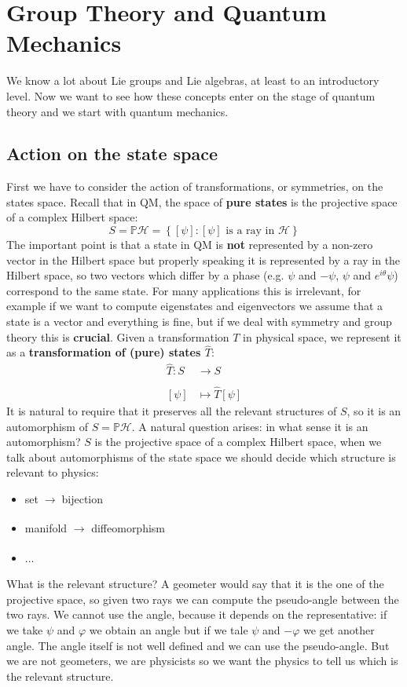 \documentclass[../main.tex]{subfiles}
\begin{document}
\setchapterpreamble[u]{\margintoc}
\chapter[Group Theory and Quantum Mechanics]{Group Theory and Quantum Mechanics\footnotemark[0]}
We know a lot about Lie groups and Lie algebras, at least to an introductory level. Now we want to see how these concepts enter on the stage of quantum theory and we start with quantum mechanics.
\section{Action on the state space}
First we have to consider the action of transformations, or symmetries, on the states space. Recall that in QM, the space of \textbf{pure states} is the projective space of a complex Hilbert space:
\[
S=\mathbb{P}\mathcal{H}=\left\{[\psi]:[\psi] \text{ is a ray in } \mathcal{H}\right\}
\]
The important point is that a state in QM is \textbf{not} represented by a non-zero vector in the Hilbert space but properly speaking it is represented by a ray in the Hilbert space, so two vectors which differ by a phase (e.g. $\psi$ and $-\psi$, $\psi$ and $e^{i\theta}\psi$) correspond to the same state. For many applications this is irrelevant, for example if we want to compute eigenstates and eigenvectors we assume that a state is a vector and everything is fine, but if we deal with symmetry and group theory this is \textbf{crucial}. Given a transformation $T$ in physical space, we represent it as a \textbf{transformation of (pure) states $\hat{T}$}:
\begin{align*}
    \hat{T}:S&\xrightarrow[]{}S\\
    [\psi]&\mapsto\hat{T}[\psi]
\end{align*}
It is natural to require that it preserves all the relevant structures of $S$, so it is an automorphism of $S=\mathbb{P}\mathcal{H}$. A natural question arises: in what sense it is an automorphism? $S$ is the projective space of a complex Hilbert space, when we talk about automorphisms of the state space we should decide which structure is relevant to physics:
\begin{itemize}
    \item set$\;\xrightarrow[]{}\;$bijection
    \item manifold $\xrightarrow[]{}$ diffeomorphism
    \item $\dots$
\end{itemize}
What is the relevant structure? A geometer would say that it is the one of the projective space, so given two rays we can compute the pseudo-angle between the two rays. We cannot use the angle, because it depends on the representative: if we take $\psi$ and $\varphi$ we obtain an angle but if we tale $\psi$ and $-\varphi$ we get another angle. The angle itself is not well defined and we can use the pseudo-angle. But we are not geometers, we are physicists so we want the physics to tell us which is the relevant structure.
\end{document}
